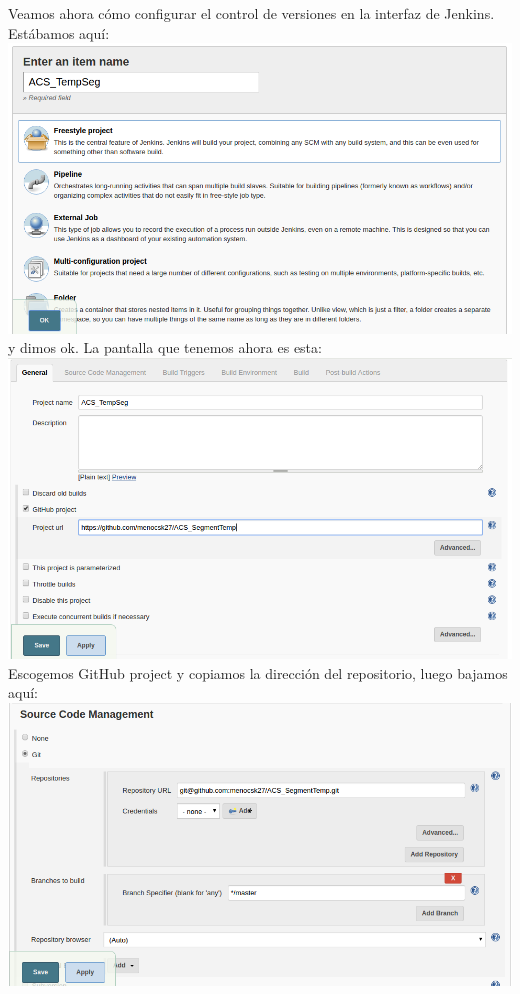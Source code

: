 \documentclass[a4paper]{article}
\begin{document}
{    Veamos ahora cómo configurar el control de versiones en la interfaz de Jenkins. 
    Estábamos aquí:
	\includegraphics[scale=0.3]{newitem} y dimos ok. La pantalla que tenemos ahora es esta: 
    \includegraphics[scale=0.3]{sourcecontrolgitjenkins} Escogemos GitHub project y copiamos la dirección del repositorio, luego bajamos aquí:\\
   \includegraphics[scale=0.3]{repositorygitssh}\\
   
}
\end{document}
